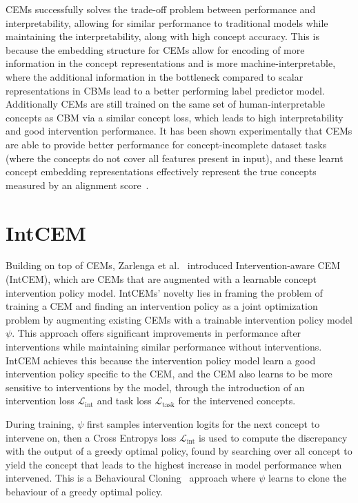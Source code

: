 \documentclass[../main.tex]{subfiles}
\begin{document}
CEMs successfully solves the trade-off problem between performance and interpretability,
allowing for similar performance to traditional models while maintaining the
interpretability, along with high concept accuracy. This is because the embedding structure
for CEMs allow for encoding of more information
in the concept representations and is more machine-interpretable, where
the additional information in the bottleneck
 compared to scalar representations in CBMs
lead to a better performing label predictor model. Additionally CEMs are still trained 
on the same set of human-interpretable concepts as CBM via a similar concept loss, which leads to
high interpretability and good intervention performance. It has been shown experimentally
that CEMs are able to provide better performance for concept-incomplete dataset tasks (where
the concepts do not cover all features present in input), and these learnt concept
embedding representations effectively represent the true concepts measured by an alignment score~\cite{cem}.

\section{IntCEM} %

Building on top of CEMs, Zarlenga et al.~\cite{intcem} introduced 
Intervention-aware CEM (IntCEM), which are CEMs that are augmented
with a learnable concept intervention policy model. IntCEMs' novelty
lies in framing the problem of training a CEM and finding
an intervention policy as a joint optimization problem by augmenting
existing CEMs with a trainable intervention policy model $\psi$. 
This approach offers significant improvements in performance after 
interventions while maintaining similar performance without 
interventions. 
IntCEM achieves this because the intervention policy model
learn a good intervention policy specific to the CEM, 
and the CEM also learns to be more sensitive to interventions
by the model, through the introduction of an intervention loss 
$\mathcal{L}_{\text{int}}$ and task loss $\mathcal{L}_{\text{task}}$ for 
the intervened concepts.

During training, $\psi$ first samples intervention
logits for the next concept to intervene on, then 
a Cross Entropys loss $\mathcal{L}_{\text{int}}$ is used to
compute the discrepancy with the output of a greedy 
optimal policy, found by searching over all concept to
yield the concept that leads to the highest increase
in model performance when intervened. This is a Behavioural
Cloning~\cite{} approach where $\psi$ learns to clone the behaviour of
a greedy optimal policy.
\end{document}
